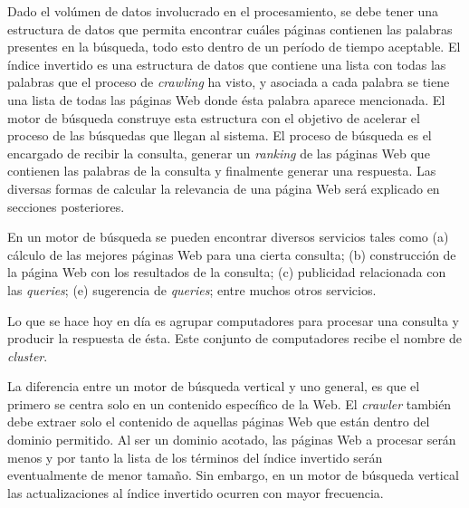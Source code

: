 Dado el volúmen de datos involucrado en el procesamiento, se debe tener una estructura de datos que permita encontrar cuáles páginas contienen las palabras presentes en la búsqueda, todo esto dentro de un período de tiempo aceptable. El índice invertido es una estructura de datos que contiene una lista con todas las palabras que el proceso de \textit{crawling} ha visto, y asociada a cada palabra se tiene una lista de todas las páginas Web donde ésta palabra aparece mencionada. El motor de búsqueda construye esta estructura con el objetivo de acelerar el proceso de las búsquedas que llegan al sistema. El proceso de búsqueda es el encargado de recibir la consulta, generar un \textit{ranking} de las páginas Web que contienen las palabras de la consulta y finalmente generar una respuesta. Las diversas formas de calcular la relevancia de una página Web será explicado en secciones posteriores.

En un motor de búsqueda se pueden encontrar diversos servicios tales como (a) cálculo de las mejores páginas Web para una cierta consulta; (b) construcción de la página Web con los resultados de la consulta; (c) publicidad relacionada con las \textit{queries}; (e) sugerencia de \textit{queries}; entre muchos otros servicios.

Lo que se hace hoy en día es agrupar computadores para procesar una consulta y producir la respuesta de ésta. Este conjunto de computadores recibe el nombre de \textit{cluster}.

La diferencia entre un motor de búsqueda vertical y uno general, es que el primero se centra solo en un contenido específico de la Web. El \textit{crawler} también debe extraer solo el contenido de aquellas páginas Web que están dentro del dominio permitido. Al ser un dominio acotado, las páginas Web a procesar serán menos y por tanto la lista de los términos del índice invertido serán eventualmente de menor tamaño. Sin embargo, en un motor de búsqueda vertical las actualizaciones al índice invertido ocurren con mayor frecuencia.










